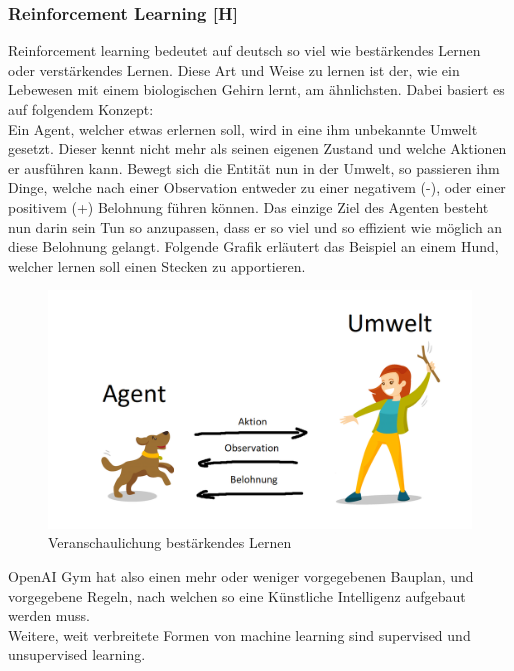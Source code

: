 \subsubsection{Reinforcement Learning [H]}\label{tech:reinfLearning:header}
Reinforcement learning bedeutet auf deutsch so viel wie bestärkendes Lernen oder verstärkendes Lernen.
Diese Art und Weise zu lernen ist der, wie ein Lebewesen mit einem biologischen Gehirn
lernt, am ähnlichsten.
Dabei basiert es auf folgendem Konzept: \\
Ein Agent, welcher etwas erlernen soll, wird in eine ihm unbekannte Umwelt gesetzt. Dieser kennt nicht mehr
als seinen eigenen Zustand und welche Aktionen er ausführen kann. Bewegt sich die Entität nun in der
Umwelt, so passieren ihm Dinge, welche nach einer Observation entweder zu einer negativem (-), oder einer
positivem (+) Belohnung führen können. Das einzige Ziel des Agenten besteht nun darin sein Tun so anzupassen, dass
er so viel und so
effizient wie möglich an diese Belohnung gelangt. Folgende Grafik erläutert das Beispiel an einem Hund,
welcher lernen soll einen Stecken zu apportieren.

\begin{figure}[H]
    \centering
    \includegraphics[scale=0.6]{pics/reinforcementLearningConcept.png}
    \caption{Veranschaulichung bestärkendes Lernen \cite{tech:reinforcementlearningDog:cite}}
    \label{tech:fig:reinfconcept}
\end{figure}

OpenAI Gym hat also einen mehr oder weniger vorgegebenen Bauplan, und vorgegebene Regeln, nach welchen
so eine Künstliche Intelligenz aufgebaut werden muss. \\
Weitere, weit verbreitete Formen von machine learning sind supervised und unsupervised learning.

